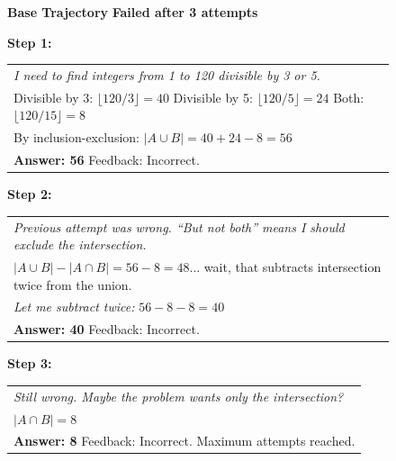 \begin{figure}[b]
\centering

\begin{tcolorbox}[
    colback=white,
    colframe=black!70,
    title=\textbf{DAPO: How many integers from 1 to 120 are divisible by 3 or 5 but not both?},
    fonttitle=\bfseries\small,
    width=\textwidth,
    boxrule=0.5pt
]

\textbf{Base Trajectory} \hfill \textcolor{red!70!black}{\textbf{Failed after 3 attempts}}

\vspace{0.5em}

\footnotesize
\textbf{Step 1:}\par
\begin{tabularx}{\linewidth}{@{}X@{}}
\textit{I need to find integers from 1 to 120 divisible by 3 or 5.} \\[0.2em]
Divisible by 3: $\lfloor 120/3 \rfloor = 40$ \quad Divisible by 5: $\lfloor 120/5 \rfloor = 24$ \quad Both: $\lfloor 120/15 \rfloor = 8$ \\[0.2em]
By inclusion-exclusion: $|A \cup B| = 40 + 24 - 8 = 56$ \\[0.2em]
\textbf{Answer: 56} \quad \textcolor{red!70!black}{Feedback: Incorrect.}
\end{tabularx}

\vspace{0.5em}

\textbf{Step 2:}\par
\footnotesize
\begin{tabularx}{\linewidth}{@{}X@{}}
\textit{Previous attempt was wrong. ``But not both'' means I should exclude the intersection.} \\[0.2em]
$|A \cup B| - |A \cap B| = 56 - 8 = 48$... wait, that subtracts intersection twice from the union. \\[0.2em]
\textit{Let me subtract twice:} $56 - 8 - 8 = 40$ \\[0.2em]
\textbf{Answer: 40} \quad \textcolor{red!70!black}{Feedback: Incorrect.}
\end{tabularx}

\vspace{0.5em}

\textbf{Step 3:}\par
\footnotesize
\begin{tabularx}{\linewidth}{@{}X@{}}
\textit{Still wrong. Maybe the problem wants only the intersection?} \\[0.2em]
$|A \cap B| = 8$ \\[0.2em]
\textbf{Answer: 8} \quad \textcolor{red!70!black}{Feedback: Incorrect. Maximum attempts reached.}
\end{tabularx}


\end{tcolorbox}
\end{figure}
